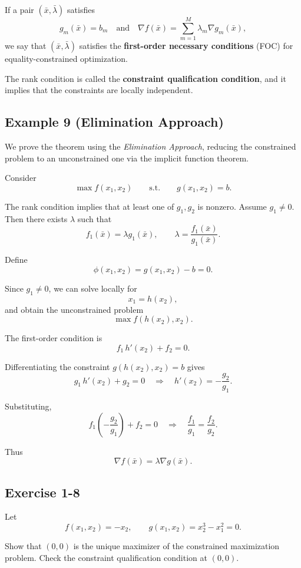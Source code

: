 \vspace{1em}

If a pair $(\bar x,\bar \lambda)$ satisfies
\[
g_m(\bar x)=b_m \quad \text{and} \quad
\nabla f(\bar x)=\sum_{m=1}^M \lambda_m \nabla g_m(\bar x),
\]
we say that $(\bar x,\bar \lambda)$ satisfies the \textbf{first-order necessary conditions}
(FOC) for equality-constrained optimization.

\medskip

The rank condition is called the \textbf{constraint qualification condition},
and it implies that the constraints are locally independent.

\vspace{1em}
\subsection*{Example 9 (Elimination Approach)}

We prove the theorem using the \textit{Elimination Approach}, reducing the constrained
problem to an unconstrained one via the implicit function theorem.

\medskip

Consider
\[
\max f(x_1,x_2)
\qquad \text{s.t.} \qquad g(x_1,x_2)=b.
\]

The rank condition implies that at least one of $g_1,g_2$ is nonzero.
Assume $g_1 \neq 0$.
Then there exists $\lambda$ such that
\[
f_1(\bar x)=\lambda g_1(\bar x),
\qquad
\lambda=\frac{f_1(\bar x)}{g_1(\bar x)}.
\]

Define
\[
\phi(x_1,x_2)=g(x_1,x_2)-b=0.
\]

Since $g_1 \neq 0$, we can solve locally for
\[
x_1=h(x_2),
\]
and obtain the unconstrained problem
\[
\max f(h(x_2),x_2).
\]

The first-order condition is
\[
f_1\,h'(x_2)+f_2=0.
\]

Differentiating the constraint $g(h(x_2),x_2)=b$ gives
\[
g_1\,h'(x_2)+g_2=0
\quad \Rightarrow \quad
h'(x_2)=-\frac{g_2}{g_1}.
\]

Substituting,
\[
f_1\left(-\frac{g_2}{g_1}\right)+f_2=0
\quad \Rightarrow \quad
\frac{f_1}{g_1}=\frac{f_2}{g_2}.
\]

Thus
\[
\nabla f(\bar x)=\lambda \nabla g(\bar x).
\]
\vspace{1em}

\begin{tcolorbox}[breakable]
\subsection*{Exercise 1-8}

Let
\[
f(x_1,x_2) = -x_2,
\qquad
g(x_1,x_2)=x_2^3 - x_1^2=0.
\]

Show that $(0,0)$ is the unique maximizer of the constrained maximization problem.
Check the constraint qualification condition at $(0,0)$.

\end{tcolorbox}



